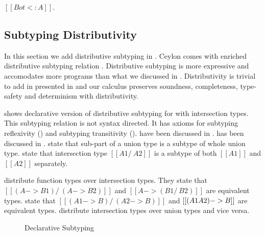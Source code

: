 \begin{lemma}
  $[[Bot <: A]]$.
\label{lemma:discussion:bls}
\end{lemma}

\subsection{Subtyping Distributivity}
\label{sec:inter:dist}

In this section we add distributive subtyping in \cal.
Ceylon \cite{} comes with enriched distributive subtyping relation \cite{}.
Distributive subtyping is more expressive and accomodates more programs than what we discussed in
. Distributivity is trivial to add in \cal presented in  and
our calculus preserves soundness, completeness, type-safety and determinism with
distributivity. 


 shows declarative version of distributive subtyping for \cal with intersection types.
This subtyping relation is not syntax directed. It has axioms for subtyping reflexivity () and
subtyping transitivity ().  have been
discussed in .  has been discussed in .
 state that sub-part of a union type is a subtype of whole union type.
 state that intersection type $[[A1 /\ A2]]$ is a subtype of both $[[A1]]$
and $[[A2]]$ separately.

  distribute function types over intersection types.
They state that $[[(A -> B1) /\ (A -> B2)]]$ and $[[A -> (B1 /\ B2)]]$ are equivalent types.
 state that $[[(A1 -> B) /\ (A2 -> B)]]$ and $[[(A1 \/ A2) -> B]]$
are equivalent types.
 distribute intersection types over union types and vice versa.


\begin{figure}[t]
  \caption{Declarative Subtyping}
  \label{fig:discussion:ds}
\end{figure}